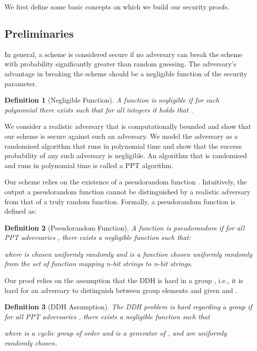 \documentclass[epsfig,a4paper,11pt,titlepage]{book}
\newtheorem{definition}{Definition}
\numberwithin{algorithm}{chapter}
\begin{document}
We first define some basic concepts on which we build our security proofs.

\subsection{Preliminaries}
In general, a scheme is considered secure if no adversary can break the scheme with probability significantly greater than random guessing. The adversary's advantage in breaking the scheme should be a negligible function of the security parameter.

\begin{definition}[Negligible Function]
A function  is negligible if for each polynomial  there exists  such that for all integers  it holds that 
.
\end{definition}

We consider a realistic adversary that is computationally bounded and show that our scheme is secure against such an adversary. We model the adversary as a randomised algorithm that runs in polynomial time and show that the success probability of any such adversary is negligible. An algorithm that is randomised and runs in polynomial time is called a \gls{PPT} algorithm.

Our scheme relies on the existence of a pseudorandom function . Intuitively, the output a pseudorandom function cannot be distinguished by a realistic adversary from that of a truly random function. Formally, a pseudorandom function is defined as:

\begin{definition}[Pseudorandom Function]
A function  is pseudorandom if for all \gls{PPT} adversaries , there exists a negligible function  such that:
\begin{center}

\end{center}
where  is chosen uniformly randomly and  is a function chosen uniformly randomly from the set of function mapping n-bit strings to n-bit strings.
\end{definition}

Our proof relies on the assumption that the \gls{DDH} is hard in a group , i.e., it is hard for an adversary to distinguish between group elements  and   given   and  .

\begin{definition}[\gls{DDH} Assumption]
The \gls{DDH} problem is hard regarding a group  if for all \gls{PPT} adversaries , there
exists a negligible function  such that
 
where  is a cyclic group of order   and  is a generator of , and  are uniformly randomly chosen.
\end{definition}
\end{document}
